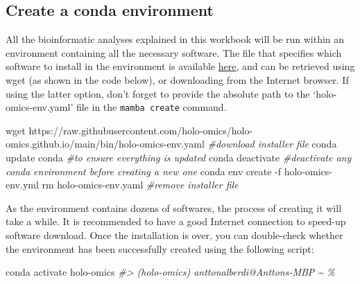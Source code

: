 \documentclass[
]{book}
\newenvironment{Shaded}{\begin{snugshade}}{\end{snugshade}}
\newcommand{\AttributeTok}[1]{\textcolor[rgb]{0.77,0.63,0.00}{#1}}
\newcommand{\CommentTok}[1]{\textcolor[rgb]{0.56,0.35,0.01}{\textit{#1}}}
\newcommand{\ExtensionTok}[1]{#1}
\newcommand{\FunctionTok}[1]{\textcolor[rgb]{0.00,0.00,0.00}{#1}}
\newcommand{\NormalTok}[1]{#1}
\begin{document}
\hypertarget{create-conda-environment}{%
\subsection*{Create a conda environment}\label{create-conda-environment}}

All the bioinformatic analyses explained in this workbook will be run within an environment containing all the necessary software. The file that specifies which software to install in the environment is available \href{https://raw.githubusercontent.com/holo-omics/holo-omics.github.io/main/bin/holo-omics-env.yaml}{here}, and can be retrieved using wget (as shown in the code below), or downloading from the Internet browser. If using the latter option, don't forget to provide the absolute path to the `holo-omics-env.yaml' file in the \texttt{mamba\ create} command.

\begin{Shaded}
\begin{Highlighting}[]
\FunctionTok{wget}\NormalTok{ https://raw.githubusercontent.com/holo{-}omics/holo{-}omics.github.io/main/bin/holo{-}omics{-}env.yaml }\CommentTok{\#download installer file}
\ExtensionTok{conda}\NormalTok{ update conda }\CommentTok{\#to ensure everything is updated}
\ExtensionTok{conda}\NormalTok{ deactivate }\CommentTok{\#deactivate any conda environment before creating a new one}
\ExtensionTok{conda}\NormalTok{ env create }\AttributeTok{{-}f}\NormalTok{ holo{-}omics{-}env.yml}
\FunctionTok{rm}\NormalTok{ holo{-}omics{-}env.yaml }\CommentTok{\#remove installer file}
\end{Highlighting}
\end{Shaded}

As the environment contains dozens of softwares, the process of creating it will take a while. It is recommended to have a good Internet connection to speed-up software download. Once the installation is over, you can double-check whether the environment has been successfully created using the following script:

\begin{Shaded}
\begin{Highlighting}[]
\ExtensionTok{conda}\NormalTok{ activate holo{-}omics}
\CommentTok{\#\textgreater{} (holo{-}omics) anttonalberdi@Anttons{-}MBP \textasciitilde{} \%}
\end{Highlighting}
\end{Shaded}
\end{document}
